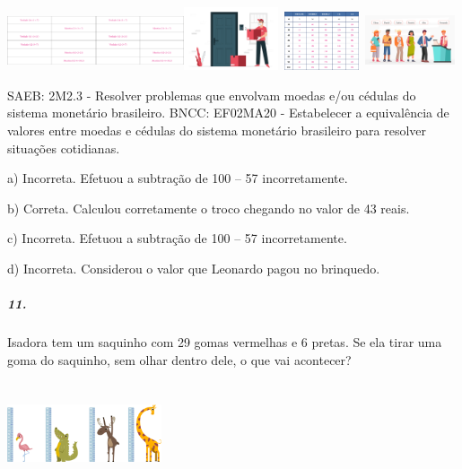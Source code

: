 \includegraphics[width=1.02736in,height=0.68704in]{media/image110.png}\includegraphics[width=1.02736in,height=0.68704in]{media/image110.png}\includegraphics[width=1.09268in,height=0.73073in]{media/image112.png}\includegraphics[width=1.01042in,height=0.67572in]{media/image111.png}\includegraphics[width=1.04264in,height=0.69727in]{media/image113.png}

SAEB: 2M2.3 - Resolver problemas que envolvam moedas e/ou cédulas do
sistema monetário brasileiro. BNCC: EF02MA20 - Estabelecer a
equivalência de valores entre moedas e cédulas do sistema monetário
brasileiro para resolver situações cotidianas.

a) Incorreta. Efetuou a subtração de 100 -- 57 incorretamente.

b) Correta. Calculou corretamente o troco chegando no valor de 43 reais.

c) Incorreta. Efetuou a subtração de 100 -- 57 incorretamente.

d) Incorreta. Considerou o valor que Leonardo pagou no brinquedo.

\subparagraph{11. }\label{section-125}

Isadora tem um saquinho com 29 gomas vermelhas e 6 pretas. Se ela tirar
uma goma do saquinho, sem olhar dentro dele, o que vai acontecer?

\includegraphics[width=1.79687in,height=1.19792in]{media/image139.png}

